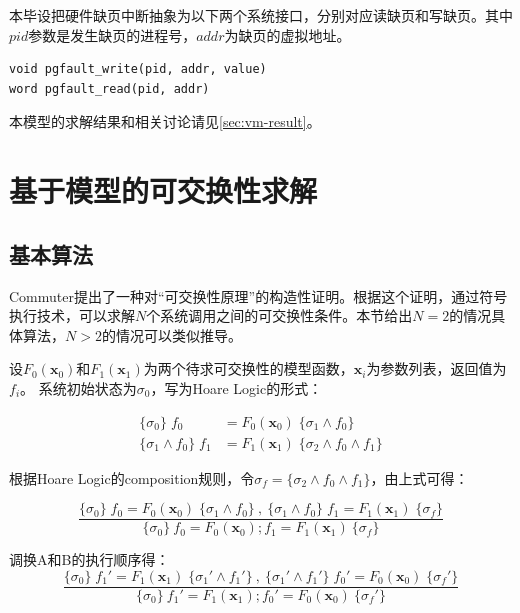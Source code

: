 本毕设把硬件缺页中断抽象为以下两个系统接口，分别对应读缺页和写缺页。其中$pid$参数是发生缺页的进程号，$addr$为缺页的虚拟地址。

\begin{lstlisting}
void pgfault_write(pid, addr, value)
word pgfault_read(pid, addr)
\end{lstlisting}

本模型的求解结果和相关讨论请见\ref{sec:vm-result}。

\section{基于模型的可交换性求解}

\subsection{基本算法}
\label{subsec:comm-alg}
Commuter\cite{commuter:2013}提出了一种对``可交换性原理''的构造性证明。根据这个证明，通过符号执行技术，可以求解$N$个系统调用之间的可交换性条件。本节给出$N=2$的情况具体算法，$N
> 2$的情况可以类似推导。

设$F_0(\boldsymbol{x}_0)$和$F_1(\boldsymbol{x}_1)$为两个待求可交换性的模型函数，$\boldsymbol{x}_i$为参数列表，返回值为$f_i$。
系统初始状态为$\sigma_0$，写为Hoare Logic\cite{Hoare:1969:ABC:363235.363259}的形式：

\begin{equation}
\label{eq:hoare1}
\begin{aligned}
\{ \sigma_0 \} \; f_0 &= F_0(\boldsymbol{x}_0) \; \{\sigma_1 \land f_0 \} \\
\{ \sigma_1 \land f_0 \} \; f_1 &= F_1(\boldsymbol{x}_1) \; \{\sigma_2 \land f_0 \land
	f_1 \}
\end{aligned}
\end{equation}

根据Hoare Logic的composition规则，令$\sigma_f = \{\sigma_2 \land f_0 \land
	f_1 \}$，由上式可得：

\begin{equation}
\label{eq:hoare2}
\frac
{ \{ \sigma_0 \} \; f_0 = F_0(\boldsymbol{x}_0) \; \{\sigma_1 \land f_0 \}\ , \
\{ \sigma_1 \land f_0 \} \; f_1 = F_1(\boldsymbol{x}_1) \; \{ \sigma_f \} }
{\{ \sigma_0 \}\ f_0 = F_0(\boldsymbol{x}_0);f_1 = F_1(\boldsymbol{x}_1) \ \{ \sigma_f
\}}
\end{equation}

调换A和B的执行顺序得：
\begin{equation}
\label{eq:hoare3}
\frac
{ \{ \sigma_0 \} \; f_1' = F_1(\boldsymbol{x}_1) \; \{\sigma_1' \land f_1' \}\ , \
\{ \sigma_1' \land f_1' \} \; f_0' = F_0(\boldsymbol{x}_0) \; \{ \sigma_f' \} }
{\{ \sigma_0 \}\ f_1' = F_1(\boldsymbol{x}_1);f_0' = F_0(\boldsymbol{x}_0) \
\{ \sigma_f' \}}
\end{equation}

